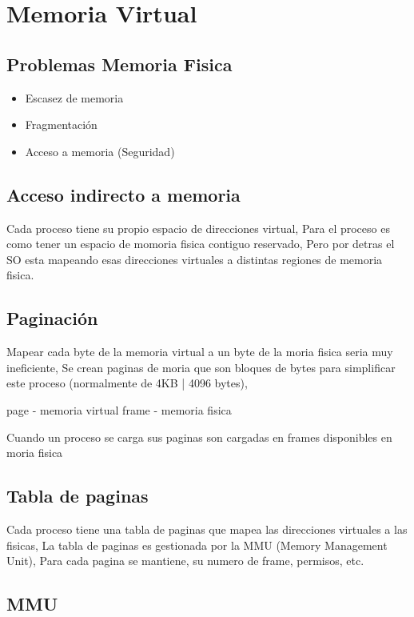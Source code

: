 \section{Memoria Virtual}

\subsection{Problemas Memoria Fisica}
\begin{itemize}
    \item Escasez de memoria
    \item Fragmentación
    \item Acceso a memoria (Seguridad)
\end{itemize}

\subsection{Acceso indirecto a memoria}

Cada proceso tiene su propio espacio de direcciones virtual, 
Para el proceso es como tener un espacio de momoria fisica contiguo reservado,
Pero por detras el SO esta mapeando esas direcciones virtuales a distintas regiones de memoria fisica.

\subsection{Paginación}

Mapear cada byte de la memoria virtual a un byte de la moria fisica seria muy ineficiente,
Se crean paginas de moria que son bloques de bytes para simplificar este proceso (normalmente de 4KB | 4096 bytes),

page - memoria virtual
frame - memoria fisica

Cuando un proceso se carga sus paginas son cargadas en frames disponibles en moria fisica

\subsection{Tabla de paginas}

Cada proceso tiene una tabla de paginas que mapea las direcciones virtuales a las fisicas,
La tabla de paginas es gestionada por la MMU (Memory Management Unit),
Para cada pagina se mantiene, su numero de frame, permisos, etc. 

\subsection{MMU}

